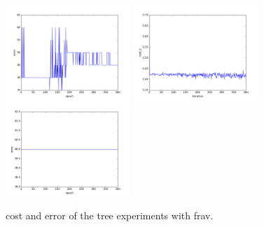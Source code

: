 \begin{figure}[htb]
\includegraphics[width=0.42\textwidth]{images/redes/ejecucion1/general_svm_frav/minidataset_tested_itself/error.png}
\includegraphics[width=0.42\textwidth]{images/redes/ejecucion1/general_svm_frav/minidataset_tested_iteself_lr_0_001/cost.png}
\includegraphics[width=0.42\textwidth]{images/redes/ejecucion1/general_svm_frav/minidataset_tested_iteself_lr_0_001/error.png}
\caption{cost and error of the tree experiments with frav.} \label{fig:frav-ejec1}
\end{figure}

